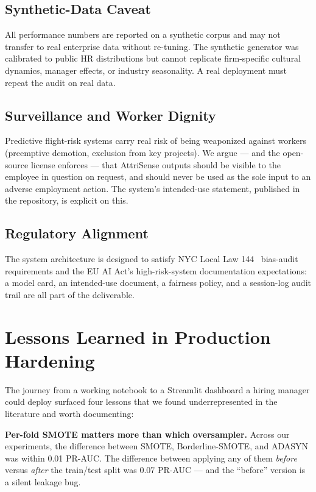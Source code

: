 \documentclass[conference]{IEEEtran}
\begin{document}
\subsection{Synthetic-Data Caveat}
All performance numbers are reported on a synthetic corpus and may
not transfer to real enterprise data without re-tuning. The
synthetic generator was calibrated to public HR distributions but
cannot replicate firm-specific cultural dynamics, manager effects,
or industry seasonality. A real deployment must repeat the audit on
real data.

\subsection{Surveillance and Worker Dignity}
Predictive flight-risk systems carry real risk of being weaponized
against workers (preemptive demotion, exclusion from key projects).
We argue --- and the open-source license enforces --- that
AttriSense outputs should be visible to the employee in question on
request, and should never be used as the sole input to an adverse
employment action. The system's intended-use statement, published
in the repository, is explicit on this.

\subsection{Regulatory Alignment}
The system architecture is designed to satisfy NYC Local Law
144~\cite{nyclaw2023} bias-audit requirements and the EU AI Act's
high-risk-system documentation expectations: a model card, an
intended-use document, a fairness policy, and a session-log audit
trail are all part of the deliverable.

\section{Lessons Learned in Production Hardening}

The journey from a working notebook to a Streamlit dashboard a
hiring manager could deploy surfaced four lessons that we found
underrepresented in the literature and worth documenting:

\textbf{Per-fold SMOTE matters more than which oversampler.}
Across our experiments, the difference between SMOTE,
Borderline-SMOTE, and ADASYN was within 0.01 PR-AUC. The
difference between applying any of them \emph{before} versus
\emph{after} the train/test split was 0.07 PR-AUC --- and the
``before'' version is a silent leakage bug.
\end{document}
